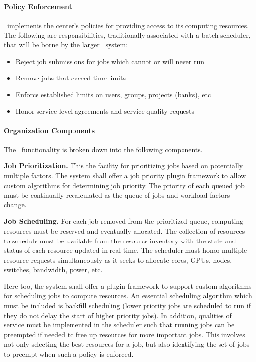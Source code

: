 \paragraph{Policy Enforcement}

\ngrm\ implements the center's policies for providing access to its
computing resources.  The following are responsibilities,
traditionally associated with a batch scheduler, that will be borne by
the larger \ngrm\ system:

\begin{itemize}
  \item Reject job submissions for jobs which cannot or will never run
  \item Remove jobs that exceed time limits
  \item Enforce established limits on users, groups, projects (banks), etc
  \item Honor service level agreements and service quality requests
\end{itemize}

\paragraph{Organization Components}

The \ngjs\ functionality is broken down into the following components.

\textbf{Job Prioritization.}  This the facility for prioritizing jobs
based on potentially multiple factors.  The system shall offer a job
priority plugin framework to allow custom algorithms for determining
job priority.  The priority of each queued job must be continually
recalculated as the queue of jobs and workload factors change.

\textbf{Job Scheduling.} For each job removed from the prioritized
queue, computing resources must be reserved and eventually allocated.
The collection of resources to schedule must be available from the
resource inventory with the state and status of each resource updated
in real-time.  The scheduler must honor multiple resource requests
simultaneously as it seeks to allocate cores, GPUs, nodes, switches,
bandwidth, power, etc.

Here too, the system shall offer a plugin framework to support custom
algorithms for scheduling jobs to compute resources.  An essential
scheduling algorithm which must be included is backfill scheduling
(lower priority jobs are scheduled to run if they do not delay the
start of higher priority jobs).  In addition, qualities of service must
be implemented in the scheduler such that running jobs can be
preempted if needed to free up resources for more important jobs.
This involves not only selecting the best resources for a job, but
also identifying the set of jobs to preempt when such a policy is
enforced.

